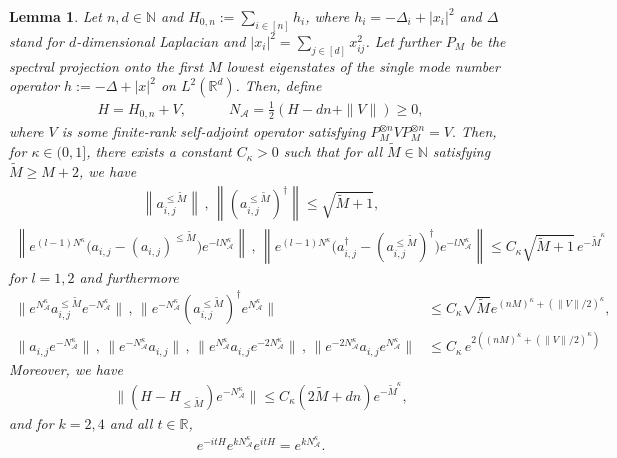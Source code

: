 \documentclass[11pt]{amsart}
\newcommand{\1}{\mathbbm{1}}
\newcommand{\R}{\mathbb{R}}
\newcommand{\N}{\mathbb{N}}
\newcommand{\NA}{N_{\mathcal{A}}}
\newcommand{\bin}[1]{}
\theoremstyle{plain}
\newtheorem{lemma}[theorem]{Lemma}
\theoremstyle{definition}
\theoremstyle{remark}
\numberwithin{equation}{section}
\begin{document}
\begin{lemma}
\label{lem:VerificationCondFiniteDimImpl}
Let $n,d\in\N$ and $H_{0,n}:=\sum_{i\in[n]}h_i$,
where $h_i = -\Delta_i +|x_i|^2$ and $\Delta$ stand for $d$-dimensional Laplacian and $|x_i|^2=\sum_{j\in [d]}x_{ij}^2$. Let further $P_M$ be the spectral projection onto the first $M$ lowest eigenstates of the single mode number operator $h := -\Delta + |x|^2$ on $L^2(\R^d)$. 
Then, define
\begin{align*}
H = H_{0,n} + V,\qquad\quad
N_{\mathcal A}= \frac{1}{2}\left(H - dn + \|V\|\right)\ge 0,
\end{align*}
where $V$ is some finite-rank self-adjoint operator satisfying $P^{\otimes n}_{M}VP^{\otimes n}_{M}= V.$ 
Then, for $\kappa\in(0,1]$, there exists a constant \(C_\kappa>0\)
such that for all \(\widetilde M\in\mathbb N\) satisfying $\widetilde M \ge M+2$, we have
\begin{align}
\label{eq:NormTruncatedJump}
\left\|a_{i,j}^{\le \widetilde{M}}\right\|\,,\,\left\|\left(a_{i,j}^{\le \widetilde{M}}\right)^{\dagger}\right\|\le \sqrt{\widetilde M+1},
\end{align}
\begin{align}
\label{eq:AbstractFiniteTruncBareJumps}
\left\|e^{(l-1)N^\kappa}\bigl(a_{i,j}-(a_{i,j})^{\le \widetilde{M}}\bigr)e^{-lN_{\mathcal A}^\kappa}\right\|\,,\, \left\|e^{(l-1)N^\kappa}\bigl(a_{i,j}^\dagger-(a_{i,j}^{\le \widetilde{M}})^\dagger \bigr)e^{-lN_{\mathcal A}^\kappa}\right\|
\le C_{\kappa} \sqrt{\widetilde M+1}\,e^{-\widetilde M^\kappa}
\end{align}
for $l=1,2$ and furthermore
\begin{align}
\label{eq:AnniCraNormTrunc}
\|e^{\NA^\kappa}a_{i,j}^{\le \widetilde{M}}e^{-N_{\mathcal A}^\kappa}\|
\,,\,
\|e^{-N_{\mathcal A}^\kappa}(a_{i,j}^{\le \widetilde{M}})^\dagger e^{N_{\mathcal A}^\kappa}\| &\le C_{\kappa} \sqrt{\widetilde M} e^{(nM)^\kappa + (\|V\|/2)^\kappa},\\ 
\label{eq:CABound}
\|a_{i,j} e^{-N_{\mathcal A}^\kappa}\|\, , \,
\|e^{-N_{\mathcal A}^\kappa}a_{i,j}\|\,,\, \|e^{N_{\mathcal A}^\kappa}a_{i,j} e^{-2N_{\mathcal A}^\kappa}\|\,,\,\|e^{-2N_{\mathcal A}^\kappa}a_{i,j} e^{N_{\mathcal A}^\kappa}\|  &\le C_\kappa\, e^{2((nM)^\kappa + (\|V\|/2)^\kappa)}
\end{align}
Moreover, we have
\begin{align}
\label{eq:HamiltonianLeakTrunc}
\|(H-H_{\le \widetilde{M}})e^{-N_{\mathcal A}^\kappa}\|
\le C_\kappa (2\widetilde M+dn)e^{-\widetilde M^\kappa},
\end{align}
and for \(k=2,4\) and all \(t\in\mathbb R\),
\begin{align}
\label{eq:ExpBound2}
e^{-itH}e^{kN_{\mathcal A}^\kappa}e^{itH}=e^{kN_{\mathcal A}^\kappa}.
\end{align}
\bin{In particular, one may take
\[
q(\widetilde M)=C_{\kappa} \sqrt{\widetilde M+1},
\qquad
q'(\widetilde M)=2 \sqrt{\widetilde M+1},
\qquad
p_n(|\mathcal A|,M)=C_{\kappa,n}(\widetilde M+1),
\qquad
r=0.
\]
}
\end{lemma}
\end{document}
